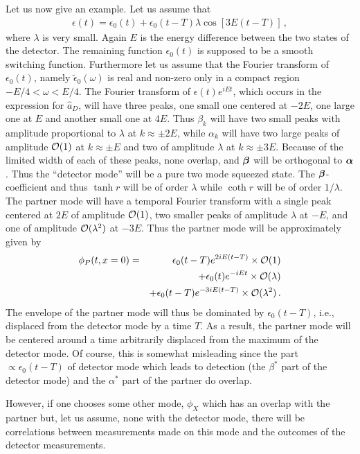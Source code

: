 \documentclass[aps,prd,showpacs,amssymb,nofootinbib,twocolumn]{revtex4}
\newcommand{\nn}{\nonumber\\}
\newcommand{\f}[1]{\mbox{\boldmath$#1$}}
\newcommand{\bea}{\begin{eqnarray}}
\newcommand{\eea}{\end{eqnarray}}
\newcommand{\ord}{{\cal O}}
\begin{document}
Let us now give an example. Let us assume that 
%
\bea
\epsilon(t)= \epsilon_0(t) +\epsilon_0(t-T)\lambda\cos[3E(t-T)]
\,,
\eea
%
where $\lambda$ is very small. 
%
Again $E$ is the energy difference between the two states of the detector.  
%
The remaining function $\epsilon_0(t)$ is supposed to be a smooth switching 
function. 
%
Furthermore let us assume that the Fourier transform of $\epsilon_0(t)$, 
namely $\tilde\epsilon_0(\omega)$ is real and non-zero only in a compact 
region $-E/4<\omega< E/4$. 
%
The Fourier transform of $\epsilon(t)e^{iEt}$, which occurs in the expression 
for $\hat a_D$, will have three peaks, one small one centered at $-2E$, 
one large one at $E$ and another small one at $4E$. 
%
Thus $\beta_k$ will have two small peaks with amplitude proportional to 
$\lambda$ at $k\approx\pm2E$, while $\alpha_k$ will have two large peaks 
of amplitude $\ord(1)$ at $k\approx\pm E$ and two of amplitude $\lambda$ at 
$k\approx\pm3E$. 
%
Because of the limited width of each of these peaks, none overlap, and  
$\f{\beta}$ will be orthogonal to $\f{\alpha}$.
%
Thus the ``detector mode'' will be a pure two mode squeezed state. 
%
The $\f{\beta}$-coefficient and thus $\tanh r$ will be of order $\lambda$
while $\coth r$ will be of order $1/\lambda$.
%
The partner mode will have a temporal Fourier transform with a single peak 
centered at $2E$ of amplitude $\ord(1)$, two smaller peaks of amplitude
$\lambda$ at $-E$, and one of amplitude $\ord(\lambda^2)$ at $-3 E$. 
%
Thus the partner mode will be approximately given by
%
\bea
\phi_P(t,x=0)
&=& 
\epsilon_0(t-T)e^{2i E (t-T)}\times\ord(1) 
\nn
&&
+
\epsilon_0(t) e^{-i E t}\times\ord(\lambda)
\nn
&&
+
\epsilon_0(t-T) e^{-3i E (t-T)}\times\ord(\lambda^2)
\,.
\eea
%
The envelope of the partner mode will thus be dominated by $\epsilon_0(t-T)$, 
i.e., displaced from the detector mode by a time $T$. 
%
As a result, the partner mode will be centered around a time arbitrarily 
displaced from the maximum of the detector mode. 
%
Of course, this is somewhat misleading since the part 
$\propto\epsilon_0(t-T)$ of detector mode which leads to detection 
(the $\beta^*$ part of the detector mode) and the $\alpha^*$ 
part of the partner do overlap.  

However, if one chooses some other mode, $\phi_X$ which has an overlap with 
the partner but, let us assume, none with the detector mode, there will be 
correlations between measurements made on this mode and the outcomes of the 
detector measurements.
\end{document}

